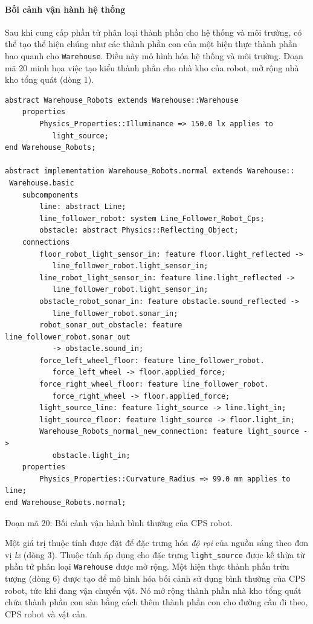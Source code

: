 \paragraph*{Bối cảnh vận hành hệ thống}
Sau khi cung cấp phần tử phân loại thành phần cho hệ thống và môi trường, có thể tạo thể hiện chúng như các thành phần con của một hiện thực thành phần bao quanh cho \texttt{Warehouse}. Điều này mô hình hóa hệ thống và môi trường. Đoạn mã 20 minh họa việc tạo kiểu thành phần cho nhà kho của robot, mở rộng nhà kho tổng quát (dòng 1).
\begin{verbatim}
abstract Warehouse_Robots extends Warehouse::Warehouse
    properties
        Physics_Properties::Illuminance => 150.0 lx applies to
           light_source;
end Warehouse_Robots;

abstract implementation Warehouse_Robots.normal extends Warehouse::
 Warehouse.basic
    subcomponents
        line: abstract Line;
        line_follower_robot: system Line_Follower_Robot_Cps;
        obstacle: abstract Physics::Reflecting_Object;
    connections
        floor_robot_light_sensor_in: feature floor.light_reflected ->
           line_follower_robot.light_sensor_in;
        line_robot_light_sensor_in: feature line.light_reflected ->
           line_follower_robot.light_sensor_in;
        obstacle_robot_sonar_in: feature obstacle.sound_reflected ->
           line_follower_robot.sonar_in;
        robot_sonar_out_obstacle: feature line_follower_robot.sonar_out
           -> obstacle.sound_in;
        force_left_wheel_floor: feature line_follower_robot.
           force_left_wheel -> floor.applied_force;
        force_right_wheel_floor: feature line_follower_robot.
           force_right_wheel -> floor.applied_force;
        light_source_line: feature light_source -> line.light_in;
        light_source_floor: feature light_source -> floor.light_in;
        Warehouse_Robots_normal_new_connection: feature light_source ->
           obstacle.light_in;
    properties
        Physics_Properties::Curvature_Radius => 99.0 mm applies to line;
end Warehouse_Robots.normal;
\end{verbatim}
\begin{center}\small Đoạn mã 20: Bối cảnh vận hành bình thường của CPS robot.\end{center}

Một giá trị thuộc tính được đặt để đặc trưng hóa \emph{độ rọi} của nguồn sáng theo đơn vị \emph{lx} (dòng 3). Thuộc tính áp dụng cho đặc trưng \texttt{light\_source} được kế thừa từ phần tử phân loại \texttt{Warehouse} được mở rộng. Một hiện thực thành phần trừu tượng (dòng 6) được tạo để mô hình hóa bối cảnh sử dụng bình thường của CPS robot, tức khi đang vận chuyển vật. Nó mở rộng thành phần nhà kho tổng quát chứa thành phần con sàn bằng cách thêm thành phần con cho đường cần đi theo, CPS robot và vật cản.


